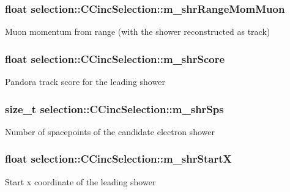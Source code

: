\subsubsection[{\texorpdfstring{m\+\_\+shr\+Range\+Mom\+Muon}{m_shrRangeMomMuon}}]{\setlength{\rightskip}{0pt plus 5cm}float selection\+::\+C\+Cinc\+Selection\+::m\+\_\+shr\+Range\+Mom\+Muon\hspace{0.3cm}{\ttfamily [private]}}\hypertarget{classselection_1_1CCincSelection_a5dff6f4a03bc26649697adbd38241be3}{}\label{classselection_1_1CCincSelection_a5dff6f4a03bc26649697adbd38241be3}
Muon momentum from range (with the shower reconstructed as track) 
\subsubsection[{\texorpdfstring{m\+\_\+shr\+Score}{m_shrScore}}]{\setlength{\rightskip}{0pt plus 5cm}float selection\+::\+C\+Cinc\+Selection\+::m\+\_\+shr\+Score\hspace{0.3cm}{\ttfamily [private]}}\hypertarget{classselection_1_1CCincSelection_a4674f9b827098184a3daba78da7048a9}{}\label{classselection_1_1CCincSelection_a4674f9b827098184a3daba78da7048a9}
Pandora track score for the leading shower 
\subsubsection[{\texorpdfstring{m\+\_\+shr\+Sps}{m_shrSps}}]{\setlength{\rightskip}{0pt plus 5cm}size\+\_\+t selection\+::\+C\+Cinc\+Selection\+::m\+\_\+shr\+Sps\hspace{0.3cm}{\ttfamily [private]}}\hypertarget{classselection_1_1CCincSelection_a4694bec595cce8e01abc186d9c34e079}{}\label{classselection_1_1CCincSelection_a4694bec595cce8e01abc186d9c34e079}
Number of spacepoints of the candidate electron shower 
\subsubsection[{\texorpdfstring{m\+\_\+shr\+StartX}{m_shrStartX}}]{\setlength{\rightskip}{0pt plus 5cm}float selection\+::\+C\+Cinc\+Selection\+::m\+\_\+shr\+StartX\hspace{0.3cm}{\ttfamily [private]}}\hypertarget{classselection_1_1CCincSelection_a692099d6cabdf30bfd269f35c3193971}{}\label{classselection_1_1CCincSelection_a692099d6cabdf30bfd269f35c3193971}
Start x coordinate of the leading shower 
